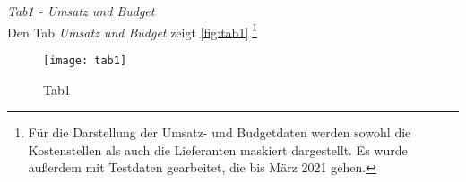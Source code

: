     \clearpage
    \noindent
    \textit{Tab1 - Umsatz und Budget}\\ 
    Den Tab \textit{Umsatz und Budget} zeigt \autoref{fig:tab1}.\footnote{Für die Darstellung der Umsatz- und
    Budgetdaten werden sowohl die Kostenstellen als auch die Lieferanten maskiert dargestellt. Es wurde außerdem mit Testdaten
    gearbeitet, die bis März 2021 gehen.}


    \begin{figure}[H]
        \centering
            \texttt{[image: tab1]}
            \caption{Tab1}
            \label{fig:tab1}
    \end{figure}


    \clearpage
    
